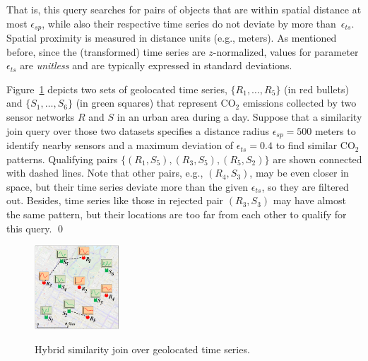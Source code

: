 That is, this query searches for pairs of objects that are within spatial distance at most $\epsilon_{sp}$, while also their respective time series do not deviate by more than~$\epsilon_{ts}$. Spatial proximity is measured in distance units (e.g., meters). As mentioned before, since the (transformed) time series are $z$-normalized, values for parameter $\epsilon_{ts}$ are {\em unitless} and are typically expressed in standard deviations.
  
\begin{myexample}
Figure~\ref{fig:simjoin_example} depicts two sets of geolocated time series, $\{R_1, \dots, R_5\}$ (in red bullets) and $\{S_1, \dots, S_6\}$ (in green squares) that represent CO$_2$ emissions collected by two sensor networks $R$ and $S$ in an urban area during a day. Suppose that a similarity join query over those two datasets specifies a distance radius $\epsilon_{sp} = 500$ meters to identify nearby sensors and a maximum deviation of $\epsilon_{ts} = 0.4$ to find similar CO$_2$ patterns. Qualifying pairs  $\{ (R_1, S_5), (R_3, S_5),  (R_5, S_2) \}$ are shown connected with dashed lines. Note that other pairs, e.g., $(R_4, S_3)$, may be even closer in space, but their time series deviate more than the given $\epsilon_{ts}$, so they are filtered out. Besides, time series like those in rejected pair $(R_3, S_3)$ may have almost the same pattern, but their locations are too far from each other to qualify for this query.
\qed
\end{myexample}

\begin{figure}[!t]
 \centering
{\includegraphics[width=0.28\textwidth]{figures/sim_join.png}}
 \vspace{-10pt}
\caption{Hybrid similarity join over geolocated time series.}
\label{fig:simjoin_example}
\end{figure}